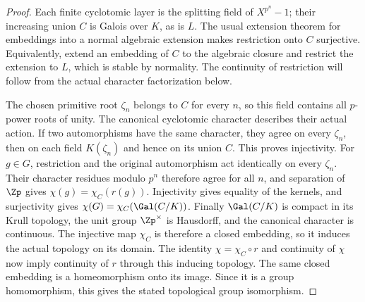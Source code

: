 \begin{proof}
Each finite cyclotomic layer is the splitting field of $X^{p^n}-1$;
their increasing union $C$ is Galois over $K$, as is $L$. The usual
extension theorem for embeddings into a normal algebraic extension
makes restriction onto $C$ surjective. Equivalently, extend an
embedding of $C$ to the algebraic closure and restrict the extension to
$L$, which is stable by normality. The continuity of restriction will follow from the actual character
factorization below.

The chosen primitive root $\zeta_n$ belongs to $C$ for every $n$,
so this field contains all $p$-power roots of unity. The canonical
cyclotomic character describes their actual action. If two
automorphisms have the same character, they agree on every $\zeta_n$,
then on each field $K(\zeta_n)$ and hence on its union $C$. This proves
injectivity. For $g\in G$, restriction and the original automorphism
act identically on every $\zeta_n$. Their character residues modulo
$p^n$ therefore agree for all $n$, and separation of $\Zp$ gives
$\chi(g)=\chi_C(r(g))$. Injectivity gives equality of the kernels,
and surjectivity gives $\chi(G)=\chi_C(\Gal(C/K))$.
Finally $\Gal(C/K)$ is compact in its Krull topology, the unit group
$\Zp^\times$ is Hausdorff, and the canonical character is continuous.
The injective map $\chi_C$ is therefore a closed embedding, so it
induces the actual topology on its domain. The identity
$\chi=\chi_C\circ r$ and continuity of $\chi$ now imply continuity
of $r$ through this inducing topology. The same closed embedding is a
homeomorphism onto its image. Since it is a group homomorphism, this
gives the stated topological group isomorphism.
\end{proof}

